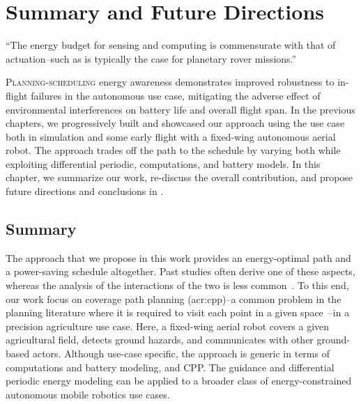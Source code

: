 
\chapter{Summary and Future Directions}
\label{cp:conc}

\begin{chapquote}{\cite{ondruska2015scheduled}}
  ``The energy budget for sensing and computing is commensurate with  that of actuation--such as is typically the case for planetary rover missions.''
\end{chapquote}
  
\vspace*{1em}



\lettrine{P}{lanning-scheduling} energy awareness demonstrates improved robustness to in-flight failures in the autonomous use case, mitigating the adverse effect of environmental interferences on battery life and overall flight span. In the previous chapters, we progressively built and showcased our approach using the use case both in simulation and some early flight with a fixed-wing autonomous aerial robot. The approach trades off the path to the schedule by varying both while exploiting differential periodic, computations, and battery models. In this chapter, we summarize our work, re-discuss the overall contribution, and propose future directions and conclusions in .


\section{Summary}
\label{sec:conc-summ}

The approach that we propose in this work provides an energy-optimal path and a power-saving schedule altogether. Past studies often derive one of these aspects, whereas the analysis of the interactions of the two is less common~\citep{brateman2006energy,sudhakar2020balancing}. To this end, our work focus on coverage path planning (\Gls{acr:cpp})--a common problem in the planning literature where it is required to visit each point in a given space~\citep{choset2001coverage,galceran2013survey}--in a precision agriculture use case. Here, a fixed-wing aerial robot covers a given agricultural field, detects ground hazards, and communicates with other ground-based actors. Although use-case specific, the approach is generic in terms of computations and battery modeling, and CPP. The guidance and differential periodic energy modeling can be applied to a broader class of energy-constrained autonomous mobile robotics use cases.

